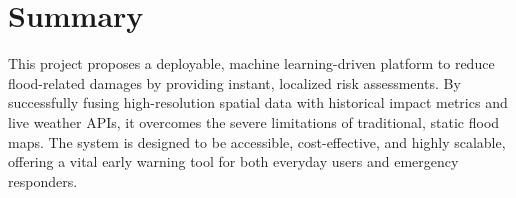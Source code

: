 \documentclass[11pt,a4paper]{article}
\begin{document}
\section{Summary}
This project proposes a deployable, machine learning-driven platform to reduce flood-related damages by providing instant, localized risk assessments. By successfully fusing high-resolution spatial data with historical impact metrics and live weather APIs, it overcomes the severe limitations of traditional, static flood maps. The system is designed to be accessible, cost-effective, and highly scalable, offering a vital early warning tool for both everyday users and emergency responders.
\end{document}
